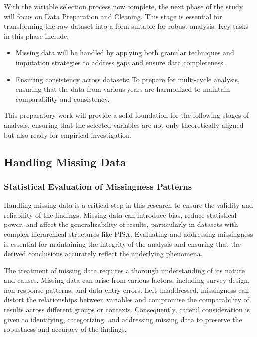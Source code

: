 \documentclass[
]{article}
\begin{document}
With the variable selection process now complete, the next phase of the
study will focus on Data Preparation and Cleaning. This stage is
essential for transforming the raw dataset into a form suitable for
robust analysis. Key tasks in this phase include:

\begin{itemize}
\item
  Missing data will be handled by applying both granular techniques and
  imputation strategies to address gaps and ensure data completeness.
\item
  Ensuring consistency across datasets: To prepare for multi-cycle
  analysis, ensuring that the data from various years are harmonized to
  maintain comparability and consistency.
\end{itemize}

This preparatory work will provide a solid foundation for the following
stages of analysis, ensuring that the selected variables are not only
theoretically aligned but also ready for empirical investigation.

\hypertarget{handling-missing-data}{%
\subsection{Handling Missing Data}\label{handling-missing-data}}

\hypertarget{statistical-evaluation-of-missingness-patterns}{%
\subsubsection{Statistical Evaluation of Missingness
Patterns}\label{statistical-evaluation-of-missingness-patterns}}

Handling missing data is a critical step in this research to ensure the
validity and reliability of the findings. Missing data can introduce
bias, reduce statistical power, and affect the generalizability of
results, particularly in datasets with complex hierarchical structures
like PISA. Evaluating and addressing missingness is essential for
maintaining the integrity of the analysis and ensuring that the derived
conclusions accurately reflect the underlying phenomena.

The treatment of missing data requires a thorough understanding of its
nature and causes. Missing data can arise from various factors,
including survey design, non-response patterns, and data entry errors.
Left unaddressed, missingness can distort the relationships between
variables and compromise the comparability of results across different
groups or contexts. Consequently, careful consideration is given to
identifying, categorizing, and addressing missing data to preserve the
robustness and accuracy of the findings.
\end{document}
